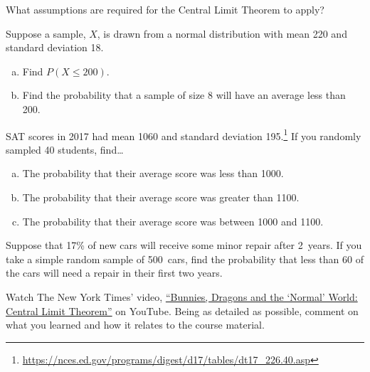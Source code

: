 \documentclass[11pt,letterpaper]{article}
\begin{document}

 What assumptions are required for the Central Limit Theorem to apply? 



\newpage



 Suppose a sample, $X$, is drawn from a normal distribution with mean 220 and standard deviation 18. 
	\begin{enumerate}[(a)]
	\item Find $P(X \leq 200)$. 
	\item Find the probability that a sample of size 8 will have an average less than 200. 
	\end{enumerate}



\newpage



 SAT scores in 2017 had mean 1060 and standard deviation 195.\footnote{\url{https://nces.ed.gov/programs/digest/d17/tables/dt17_226.40.asp}} If you randomly sampled 40 students, find\dots
	\begin{enumerate}[(a)]
	\item The probability that their average score was less than 1000. 
	\item The probability that their average score was greater than 1100. 
	\item The probability that their average score was between 1000 and 1100. 
	\end{enumerate}



\newpage



 Suppose that 17\% of new cars will receive some minor repair after 2~years. If you take a simple random sample of 500~cars, find the probability that less than 60 of the cars will need a repair in their first two years. 



\newpage



 Watch The New York Times' video, \href{https://www.youtube.com/watch?v=jvoxEYmQHNM&t=1s&pp=ygUfbnl0IGJ1bm5pZXMgYW5kIHdyYW9uZ3MgY2VudHJhbA\%3D\%3D}{``Bunnies, Dragons and the `Normal' World: Central Limit Theorem''} on YouTube. Being as detailed as possible, comment on what you learned and how it relates to the course material. 
\end{document}
